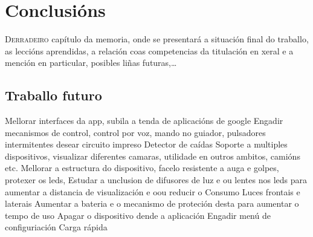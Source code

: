 \chapter{Conclusións}
\label{chap:conclusions}

\lettrine{D}{erradeiro} capítulo da memoria, onde se presentará a
situación final do traballo, as leccións aprendidas, a relación coas
competencias da titulación en xeral e a mención en particular,
posibles liñas futuras,\dots
\section{Traballo futuro}
Mellorar interfaces da app, subila a tenda de aplicacións de google
Engadir mecanismos de control, control por voz, mando no guiador, pulsadores intermitentes
desear circuito impreso
Detector de caídas
Soporte a multiples dispositivos, visualizar diferentes camaras, utilidade en outros ambitos, camións etc.
Mellorar a estructura do dispositivo, facelo resistente a auga e golpes, protexer os leds,
Estudar a unclusion de difusores de luz e ou lentes nos leds para aumentar a distancia de visualización e oou reducir o Consumo
Luces frontais e laterais
Aumentar a bateria e o mecanismo de proteción desta para aumentar o tempo de uso
Apagar o dispositivo dende a aplicación
Engadir menú de configuriación
Carga rápida
